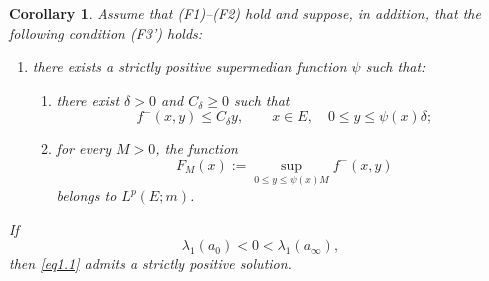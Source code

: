 \documentclass[11pt,a4paper,reqno]{amsart}
\newtheorem{corollary}[theorem]{\bf Corollary}
\theoremstyle{definition}
\numberwithin{equation}{section}
\begin{document}
\begin{corollary}
\label{cor.weakerF3}
Assume that \textup{(F1)--(F2)} hold and suppose, in addition, that the following  condition \textup{(F3')} holds:
\begin{enumerate}
\item[{\rm (F3')}] there exists a strictly positive supermedian function $\psi$ such that:
\begin{enumerate}
\item[(i)] there exist $\delta>0$ and $C_\delta\ge0$ such that
\[
f^-(x,y)\le C_\delta y,
\qquad x\in E,\quad 0\le y\le \psi(x)\delta;
\]
\item[(ii)] for every $M>0$, the function 
\[
F_M(x):=\sup_{0\le y\le \psi(x) M}f^-(x,y)
\]
belongs to $L^p(E;m)$.
\end{enumerate} 
\end{enumerate}
If
\begin{equation}
\label{eq.weakerF3.spectral}
\lambda_1(a_0)<0<\lambda_1(a_\infty),
\end{equation}
then \eqref{eq1.1} admits a strictly positive solution.
\end{corollary}
\end{document}
